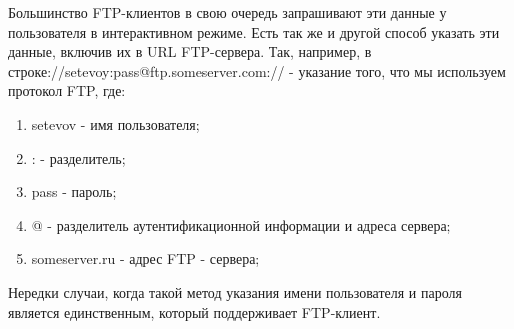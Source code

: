 Большинство FTP-клиентов в свою очередь запрашивают эти данные у пользователя в интерактивном режиме. 
Есть так же и другой способ указать эти данные, включив их в URL FTP-сервера. 
Так, например, в строке://setevoy:pass@ftp.someserver.com:// - указание того, что мы используем протокол FTP, где:
\begin{enumerate}
	\item setevov - имя пользователя;
	\item : - разделитель;
	\item pass - пароль;
	\item @ - разделитель аутентификационной информации и адреса сервера;
	\item someserver.ru - адрес FTP - сервера;
\end{enumerate}

Нередки случаи, когда такой метод указания имени пользователя и пароля является единственным, который поддерживает FTP-клиент.

